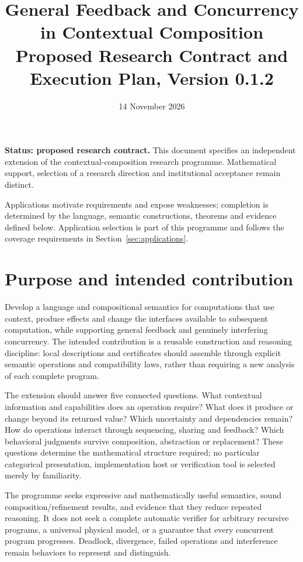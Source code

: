 \documentclass[11pt,a4paper]{article}
\title{General Feedback and Concurrency in Contextual Composition\\[5pt]\large Proposed Research Contract and Execution Plan, Version 0.1.2}
\author{}
\date{14 November 2026}
\begin{document}
\maketitle

\textbf{Status: proposed research contract.} This document specifies an independent extension of the contextual-composition research programme. Mathematical support, selection of a research direction and institutional acceptance remain distinct.

Applications motivate requirements and expose weaknesses; completion is determined by the language, semantic constructions, theorems and evidence defined below. Application selection is part of this programme and follows the coverage requirements in Section~\ref{sec:applications}.

\section{Purpose and intended contribution}\label{sec:purpose}

Develop a language and compositional semantics for computations that use context, produce effects and change the interfaces available to subsequent computation, while supporting general feedback and genuinely interfering concurrency. The intended contribution is a reusable construction and reasoning discipline: local descriptions and certificates should assemble through explicit semantic operations and compatibility laws, rather than requiring a new analysis of each complete program.

The extension should answer five connected questions. What contextual information and capabilities does an operation require? What does it produce or change beyond its returned value? Which uncertainty and dependencies remain? How do operations interact through sequencing, sharing and feedback? Which behavioral judgments survive composition, abstraction or replacement? These questions determine the mathematical structure required; no particular categorical presentation, implementation host or verification tool is selected merely by familiarity.

The programme seeks expressive and mathematically useful semantics, sound composition/refinement results, and evidence that they reduce repeated reasoning. It does not seek a complete automatic verifier for arbitrary recursive programs, a universal physical model, or a guarantee that every concurrent program progresses. Deadlock, divergence, failed operations and interference remain behaviors to represent and distinguish.
\end{document}
